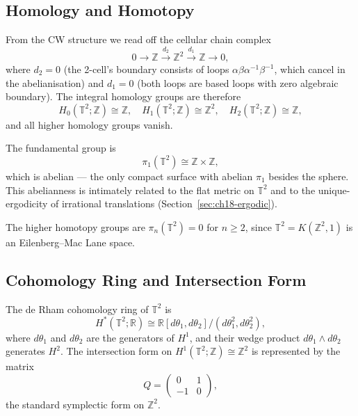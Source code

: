 \subsection{Homology and Homotopy}\label{subsec:ch18-homology}

From the CW structure we read off the cellular chain complex
\[
  0 \to \mathbb{Z} \xrightarrow{d_2} \mathbb{Z}^2 \xrightarrow{d_1} \mathbb{Z} \to 0,
\]
where $d_2 = 0$ (the 2-cell's boundary consists of loops $\alpha\beta\alpha^{-1}\beta^{-1}$,
which cancel in the abelianisation) and $d_1 = 0$ (both loops are based loops with
zero algebraic boundary).
The integral homology groups are therefore
\begin{equation}\label{eq:torus-homology}
  H_0(\mathbb{T}^2;\mathbb{Z}) \cong \mathbb{Z}, \quad
  H_1(\mathbb{T}^2;\mathbb{Z}) \cong \mathbb{Z}^2, \quad
  H_2(\mathbb{T}^2;\mathbb{Z}) \cong \mathbb{Z},
\end{equation}
and all higher homology groups vanish.

The fundamental group is
\begin{equation}\label{eq:torus-pi1}
  \pi_1(\mathbb{T}^2) \cong \mathbb{Z} \times \mathbb{Z},
\end{equation}
which is abelian — the only compact surface with abelian $\pi_1$ besides the sphere.
This abelianness is intimately related to the flat metric on $\mathbb{T}^2$
and to the unique-ergodicity of irrational translations (Section~\ref{sec:ch18-ergodic}).

The higher homotopy groups are $\pi_n(\mathbb{T}^2) = 0$ for $n \ge 2$,
since $\mathbb{T}^2 = K(\mathbb{Z}^2, 1)$ is an Eilenberg--Mac Lane space.

\subsection{Cohomology Ring and Intersection Form}\label{subsec:ch18-cohomology}

The de Rham cohomology ring of $\mathbb{T}^2$ is
\begin{equation}\label{eq:torus-deRham}
  H^*(\mathbb{T}^2;\mathbb{R}) \cong \mathbb{R}[d\theta_1, d\theta_2] / (d\theta_1^2, d\theta_2^2),
\end{equation}
where $d\theta_1$ and $d\theta_2$ are the generators of $H^1$, and their
wedge product $d\theta_1 \wedge d\theta_2$ generates $H^2$.
The intersection form on $H^1(\mathbb{T}^2;\mathbb{Z}) \cong \mathbb{Z}^2$ is
represented by the matrix
\begin{equation}
  Q = \begin{pmatrix} 0 & 1 \\ -1 & 0 \end{pmatrix},
\end{equation}
the standard symplectic form on $\mathbb{Z}^2$.

